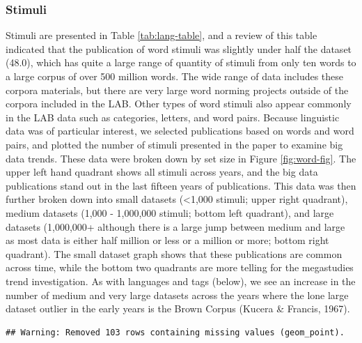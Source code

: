 \documentclass[english,man]{apa6}
\theoremstyle{definition}
\theoremstyle{definition}
\theoremstyle{definition}
\theoremstyle{remark}
\begin{document}
\subsubsection{Stimuli}\label{stimuli}

Stimuli are presented in Table \ref{tab:lang-table}, and a review of
this table indicated that the publication of word stimuli was slightly
under half the dataset (48.0), which has quite a large range of quantity
of stimuli from only ten words to a large corpus of over 500 million
words. The wide range of data includes these corpora materials, but
there are very large word norming projects outside of the corpora
included in the LAB. Other types of word stimuli also appear commonly in
the LAB data such as categories, letters, and word pairs. Because
linguistic data was of particular interest, we selected publications
based on words and word pairs, and plotted the number of stimuli
presented in the paper to examine big data trends. These data were
broken down by set size in Figure \ref{fig:word-fig}. The upper left
hand quadrant shows all stimuli across years, and the big data
publications stand out in the last fifteen years of publications. This
data was then further broken down into small datasets (\textless{}1,000
stimuli; upper right quadrant), medium datasets (1,000 - 1,000,000
stimuli; bottom left quadrant), and large datasets (1,000,000+ although
there is a large jump between medium and large as most data is either
half million or less or a million or more; bottom right quadrant). The
small dataset graph shows that these publications are common across
time, while the bottom two quadrants are more telling for the
megastudies trend investigation. As with languages and tags (below), we
see an increase in the number of medium and very large datasets across
the years where the lone large dataset outlier in the early years is the
Brown Corpus (Kucera \& Francis, 1967).

\begin{verbatim}
## Warning: Removed 103 rows containing missing values (geom_point).
\end{verbatim}
\end{document}
